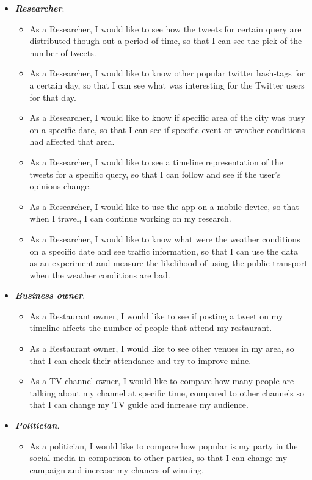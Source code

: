 \documentclass{l4proj}
\begin{document}
\begin{itemize}%
	\item \textbf{\textit{Researcher}}.
	\begin{itemize}
		\item As a Researcher, I would like to see how the tweets for certain query are distributed though out a period of time, so that I can see the pick of the number of tweets.
		\item As a Researcher, I would like to know other popular twitter hash-tags for a certain day, so that I can see what was interesting for the Twitter users for that day.
		\item As a Researcher, I would like to know if specific area of the city was busy on a specific date, so that I can see if specific event or weather conditions had affected that area.
		\item As a Researcher, I would like to see a timeline representation of the tweets for a specific query, so that I can follow and see if the user’s opinions change.
		\item As a Researcher, I would like to use the app on a mobile device, so that when I travel, I can continue working on my research.
		\item As a Researcher, I would like to know what were the weather conditions on a specific date and see traffic information, so that I can use the data as an experiment and measure the likelihood of using the public transport when the weather conditions are bad. 
	\end{itemize}
	
	\item \textbf{\textit{Business owner}}.
	\begin{itemize}
		\item As a Restaurant owner, I would like to see if posting a tweet on my timeline affects the number of people that attend my restaurant.
		\item As a Restaurant owner, I would like to see other venues in my area, so that I can check their attendance and try to improve mine.
		\item As a TV channel owner, I would like to compare how many people are talking about my channel at specific time, compared to other channels so that I can change my TV guide and increase my audience.
	\end{itemize}
	
	\item \textbf{\textit{Politician}}.
	\begin{itemize}
		\item As a politician, I would like to compare how popular is my party in the social media in comparison to other parties, so that I can change my campaign and increase my chances of winning.
	\end{itemize}
	

\end{itemize}
\end{document}
